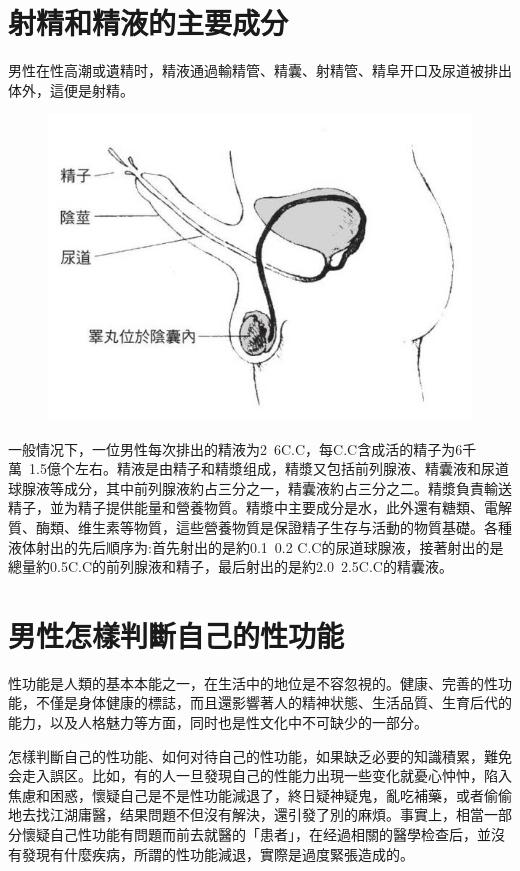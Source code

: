 \documentclass[12pt,UTF8]{ctexbook}
\begin{document}
\section{射精和精液的主要成分}

男性在性高潮或遺精时，精液通過輸精管、精囊、射精管、精阜开口及尿道被排出体外，這便是射精。

\begin{figure}[htbp]
	\centering
	\includegraphics[width=0.7\linewidth]{5}
	\caption{}
\end{figure}

一般情况下，一位男性每次排出的精液为2~6C.C，每C.C含成活的精子为6千萬~1.5億个左右。精液是由精子和精漿组成，精漿又包括前列腺液、精囊液和尿道球腺液等成分，其中前列腺液約占三分之一，精囊液約占三分之二。精漿負責輸送精子，並为精子提供能量和營養物質。精漿中主要成分是水，此外還有糖類、電解質、酶類、维生素等物質，這些營養物質是保證精子生存与活動的物質基礎。各種液体射出的先后順序为:首先射出的是約0.1~0.2 C.C的尿道球腺液，接著射出的是總量約0.5C.C的前列腺液和精子，最后射出的是約2.0~2.5C.C的精囊液。

\section{男性怎樣判斷自己的性功能}

性功能是人類的基本本能之一，在生活中的地位是不容忽視的。健康、完善的性功能，不僅是身体健康的標誌，而且還影響著人的精神状態、生活品質、生育后代的能力，以及人格魅力等方面，同时也是性文化中不可缺少的一部分。

怎樣判斷自己的性功能、如何对待自己的性功能，如果缺乏必要的知識積累，難免会走入誤区。比如，有的人一旦發現自己的性能力出現一些变化就憂心忡忡，陷入焦慮和困惑，懷疑自己是不是性功能減退了，終日疑神疑鬼，亂吃補藥，或者偷偷地去找江湖庸醫，结果問題不但沒有解決，還引發了別的麻煩。事實上，相當一部分懷疑自己性功能有問題而前去就醫的「患者」，在经過相關的醫學检查后，並沒有發現有什麼疾病，所謂的性功能減退，實際是過度緊張造成的。
\end{document}
